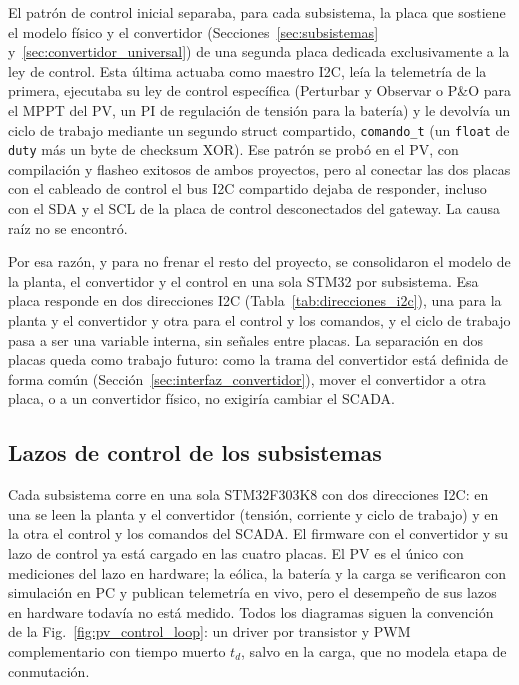 \documentclass[conference]{IEEEtran}
\begin{document}
El patrón de control inicial separaba, para cada subsistema, la placa que sostiene el modelo físico y el convertidor (Secciones~\ref{sec:subsistemas} y~\ref{sec:convertidor_universal}) de una segunda placa dedicada exclusivamente a la ley de control. Esta última actuaba como maestro I2C, leía la telemetría de la primera, ejecutaba su ley de control específica (Perturbar y Observar o P\&O para el MPPT del PV, un PI de regulación de tensión para la batería) y le devolvía un ciclo de trabajo mediante un segundo struct compartido, \texttt{comando\_t} (un \texttt{float} de \texttt{duty} más un byte de checksum XOR). Ese patrón se probó en el PV, con compilación y flasheo exitosos de ambos proyectos, pero al conectar las dos placas con el cableado de control el bus I2C compartido dejaba de responder, incluso con el SDA y el SCL de la placa de control desconectados del gateway. La causa raíz no se encontró.

Por esa razón, y para no frenar el resto del proyecto, se consolidaron el modelo de la planta, el convertidor y el control en una sola STM32 por subsistema. Esa placa responde en dos direcciones I2C (Tabla~\ref{tab:direcciones_i2c}), una para la planta y el convertidor y otra para el control y los comandos, y el ciclo de trabajo pasa a ser una variable interna, sin señales entre placas. La separación en dos placas queda como trabajo futuro: como la trama del convertidor está definida de forma común (Sección~\ref{sec:interfaz_convertidor}), mover el convertidor a otra placa, o a un convertidor físico, no exigiría cambiar el SCADA.

\subsection{Lazos de control de los subsistemas}

Cada subsistema corre en una sola STM32F303K8 con dos direcciones I2C: en una se leen la planta y el convertidor (tensión, corriente y ciclo de trabajo) y en la otra el control y los comandos del SCADA. El firmware con el convertidor y su lazo de control ya está cargado en las cuatro placas. El PV es el único con mediciones del lazo en hardware; la eólica, la batería y la carga se verificaron con simulación en PC y publican telemetría en vivo, pero el desempeño de sus lazos en hardware todavía no está medido. Todos los diagramas siguen la convención de la Fig.~\ref{fig:pv_control_loop}: un driver por transistor y PWM complementario con tiempo muerto $t_d$, salvo en la carga, que no modela etapa de conmutación.
\end{document}
